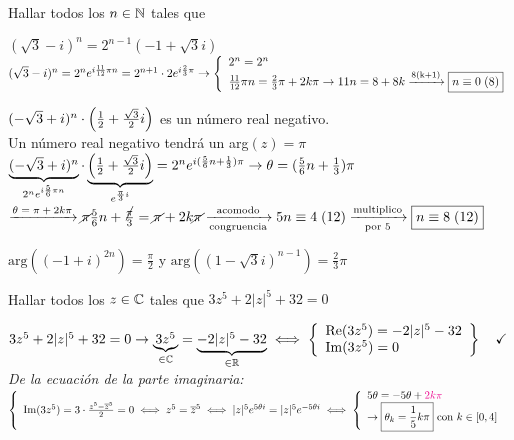 \documentclass[12pt,a4paper, spanish]{article}
\begin{document}
\ejercicio
Hallar todos los $n \en \naturales$ tales que
\begin{enumerate}[label=\roman*)]
	\begin{minipage}{0.7\textwidth}
		\item $(\sqrt3 -i)^n = 2^{n-1}(-1 + \sqrt3 i)$ \\
		\separadorCorto
		$(\sqrt3 -i)^n = 2^n e^{i\frac{11}{12}\pi n} = 2^{n+1}\cdot 2e^{i \frac{2}{3} \pi}\\
			\to
			\llave{l}{
				2^n = 2^n\\
				\frac{11}{12}\pi n = \frac{2}{3}\pi + 2k \pi \to 11n = 8+8k \flecha{8(k+1)} \boxed{\congruencia{n}{0}{8}}
			}$
	\end{minipage}

	\item $(-\sqrt3 + i)^n \cdot \parentesis{\frac{1}{2} + \frac{\sqrt3}{2}i}$ es un número real negativo.\\
	      \separadorCorto
	      Un número real negativo tendrá un arg$(z) = \pi$\\
	      $\ub{(-\sqrt3 + i)^n}{2^ne^{i\frac{5}{6}\pi n}} \cdot \ub{\parentesis{\frac{1}{2} + \frac{\sqrt3}{2}i}}{e^{\frac{\pi}{3}i}} =
		      2^ne^{i(\frac{5}{6}n + \frac{1}{3}) \pi} \to \theta = (\frac{5}{6}n + \frac{1}{3}) \pi $\\
	      $\flecha{$\theta = \pi + 2k\pi$}
		      \cancel\pi \frac{5}{6}n + \frac{\cancel\pi}{3} = \cancel\pi + 2k\cancel\pi
		      \flecha{acomodo}[congruencia]
		      \congruencia{5n}{4}{12}
		      \flecha{multiplico}[por 5]
		      \boxed{\congruencia{n}{8}{12}} $

	\item $\text{arg}((-1+i)^{2n}) = \frac{\pi}{2}$ y $\text{arg}((1-\sqrt3 i)^{n-1}) = \frac{2}{3}\pi$

	      \separadorCorto
\end{enumerate}
\setcounter{ejercicio}{8}

\ejercicio
Hallar todos los $z \en \complejos$ tales que $3z^5 + 2|z|^5 + 32 = 0$

\separadorCorto
$3 z^5 + 2|z|^5 +32 = 0
	\to
	\ub{3z^5}{\en \complejos} = \ub{-2|z|^5- 32}{\en \reales}
	\sisolosi
	\llaves{l}{
		\re(3z^5) =  -2|z|^5 - 32\\
		\im(3z^5) =  0
	} \Tilde$\\

\textit{De la ecuación de la parte imaginaria: }\\
$\llave{l}{
		\im(3z^5) = 3 \cdot \frac{z^5 - \conj z^5}{2} = 0
		\sisolosi
		z^5 = \conj z^5
		\sisolosi
		|z|^5 e^{5 \theta i} = |z|^5 e^{-5 \theta i}
		\sisolosi
		\llave{l}{
			5 \theta = -5 \theta + \magenta{$2k\pi$}\\
			\to \boxed{\theta_k = \frac{1}{5}k\pi} \text{ con } k \en [0,4]
		}
	}$\\
\end{document}
